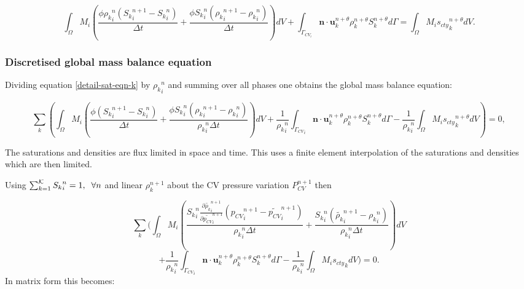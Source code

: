 \begin{equation}
\int_\Omega M_i (\frac{\phi{\rho_k}_i^n ({S_k}_i^{n+1}-{S_k}_i^n) }{\Delta t} 
+ \frac{\phi{S_k}_i^n( {\rho_k}_i^{n+1}-{\rho_k}_i^n)} {\Delta t} ) dV
+ \int_{\Gamma_{CV_i}} {\mathbf n} \cdot {\mathbf u}_k^{n+\theta} \rho_k^{n+\theta} S_k^{n+\theta} 
d\Gamma 
= \int_\Omega M_i {s_{cty}}_k^{n+\theta} dV.
\label{detail-sat-eqn-k}
\end{equation}
 
 
\subsubsection{Discretised global mass balance equation} 
 
Dividing equation \ref{detail-sat-eqn-k} by ${\rho_k}^n_i $ and summing 
over all phases one obtains the global mass balance equation: 

 
\begin{equation}
 \sum_k \left(
\int_\Omega M_i (\frac{ \phi({S_k}_i^{n+1}-{S_k}_i^n) }{\Delta t} 
+ \frac{\phi{S_k}_i^n( {\rho_k}_i^{n+1}-{\rho_k}_i^n)} {{\rho_k}_i^n\Delta t} ) dV
+ \frac{1}{{\rho_k}_i^n}\int_{{\Gamma_{CV}}_i} 
{\mathbf n} \cdot {\mathbf u}_k^{n+\theta} \rho_k^{n+\theta}   S_k^{n+\theta} d\Gamma
- \frac{1}{{\rho_k}_i^n} \int_\Omega M_i {s_{cty}}_k^{n+\theta} dV \right) =0,
\label{detail-sat-eqn-k-sum}
\end{equation}

The saturations and densities are flux limited in space and 
time. This uses a finite element 
interpolation of the saturations and densities which are then limited. 
			


Using $\sum_{k=1}^{\cal K} {S_k}_i^n =1, \;\; \forall n$ and linear 
$\rho_k^{n+1}$ about the CV pressure variation $P_{CV}^{n+1}$ then 

\begin{equation}
 \sum_k ( \int_{\Omega} M_i 
( \frac{{S_k}_i^n \frac{\partial \tilde{\rho_k}_i^{n+1}}{\partial \tilde{ p_{CV}}_i^{n+1}}({p_{CV}}_i^{n+1}-\tilde{p_{CV}}_i^{n+1})
} {{\rho_k}_i^n\Delta t} 
+ \frac{{S_k}_i^n( \tilde{\rho_k}_i^{n+1}-{\rho_k}_i^n)} 
{{\rho_k}_i^n \Delta t} ) dV
\end{equation}
\begin{equation}
+ \frac{1}{{\rho_k}_i^n}\int_{{\Gamma_{CV}}_i} {\mathbf n} \cdot {\mathbf u}_k^{n+\theta} \rho_k^{n+\theta} S_k^{n+\theta} d\Gamma
- \frac{1}{{\rho_k}_i^n} \int_\Omega M_i {s_{cty}}_k dV ) =0.
\label{detail-global-cty}
\end{equation}
In matrix form this becomes:

